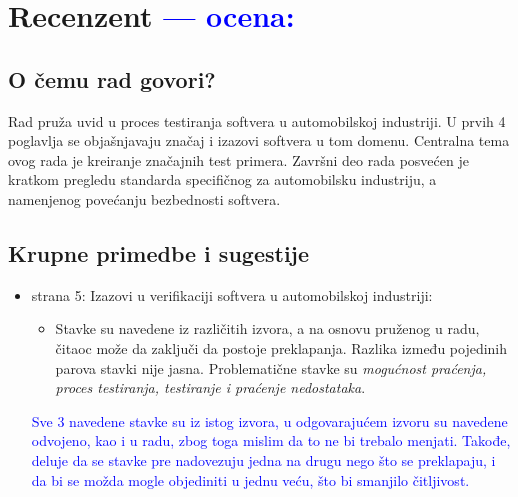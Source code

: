 \documentclass[a4paper]{report}
\newcommand{\odgovor}[1]{\textcolor{blue}{#1}}
\begin{document}
\chapter{Recenzent \odgovor{--- ocena:} }


\section{O čemu rad govori?}

Rad pruža uvid u proces testiranja softvera u automobilskoj industriji. U prvih 4 poglavlja se objašnjavaju značaj i izazovi softvera u tom domenu. Centralna tema ovog rada je kreiranje značajnih test primera. Završni deo rada posvećen je kratkom pregledu standarda specifičnog za automobilsku industriju, a namenjenog povećanju bezbednosti softvera.

\section{Krupne primedbe i sugestije}

\begin{itemize}
\item strana 5: Izazovi u verifikaciji softvera u automobilskoj industriji:
  \begin{itemize}
  \item Stavke su navedene iz različitih izvora, a na osnovu pruženog u radu, čitaoc može da zaključi da postoje preklapanja. Razlika između pojedinih parova stavki nije jasna. Problematične stavke su {\em{mogućnost praćenja, proces testiranja, testiranje i praćenje nedostataka}}.
  \end{itemize} \odgovor{Sve 3 navedene stavke su iz istog izvora, u odgovarajućem izvoru su navedene odvojeno, kao i u radu, zbog toga mislim da to ne bi trebalo menjati. Takođe, deluje da se stavke pre nadovezuju jedna na drugu nego što se preklapaju, i da bi se možda mogle objediniti u jednu veću, što bi smanjilo čitljivost.}
\end{itemize}
\end{document}
